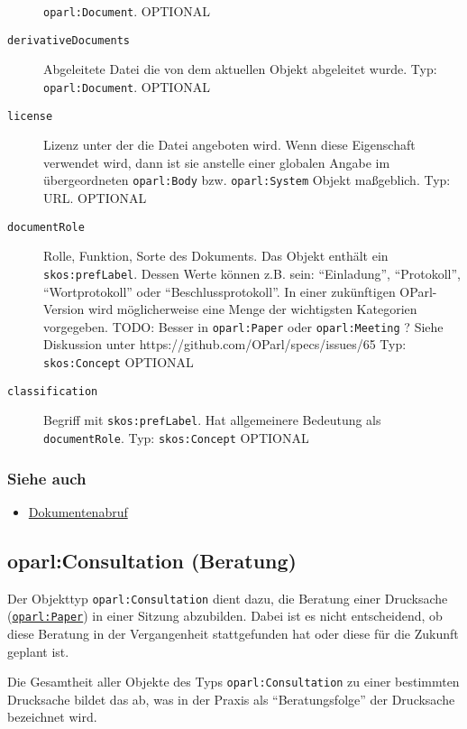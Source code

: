 \documentclass[,a4paper]{article}
\begin{document}
\begin{description}
\texttt{oparl:Document}. OPTIONAL
\item[\texttt{derivativeDocuments}]
Abgeleitete Datei die von dem aktuellen Objekt abgeleitet wurde. Typ:
\texttt{oparl:Document}. OPTIONAL
\item[\texttt{license}]
Lizenz unter der die Datei angeboten wird. Wenn diese Eigenschaft
verwendet wird, dann ist sie anstelle einer globalen Angabe im
übergeordneten \texttt{oparl:Body} bzw. \texttt{oparl:System} Objekt
maßgeblich. Typ: URL. OPTIONAL
\item[\texttt{documentRole}]
Rolle, Funktion, Sorte des Dokuments. Das Objekt enthält ein
\texttt{skos:prefLabel}. Dessen Werte können z.B. sein: ``Einladung'',
``Protokoll'', ``Wortprotokoll'' oder ``Beschlussprotokoll''. In einer
zukünftigen OParl-Version wird möglicherweise eine Menge der wichtigsten
Kategorien vorgegeben. TODO: Besser in \texttt{oparl:Paper} oder
\texttt{oparl:Meeting} ? Siehe Diskussion unter
https://github.com/OParl/specs/issues/65 Typ: \texttt{skos:Concept}
OPTIONAL
\item[\texttt{classification}]
Begriff mit \texttt{skos:prefLabel}. Hat allgemeinere Bedeutung als
\texttt{documentRole}. Typ: \texttt{skos:Concept} OPTIONAL
\end{description}

\subsubsection{Siehe auch}\label{siehe-auch}

\begin{itemize}
\itemsep1pt\parskip0pt
\item
  \hyperref[dokumentenabruf]{Dokumentenabruf}
\end{itemize}

\subsection{oparl:Consultation (Beratung)}\label{oparlux5fconsultation}

Der Objekttyp \texttt{oparl:Consultation} dient dazu, die Beratung einer
Drucksache (\hyperref[oparlux5fpaper]{\texttt{oparl:Paper}}) in einer
Sitzung abzubilden. Dabei ist es nicht entscheidend, ob diese Beratung
in der Vergangenheit stattgefunden hat oder diese für die Zukunft
geplant ist.

Die Gesamtheit aller Objekte des Typs \texttt{oparl:Consultation} zu
einer bestimmten Drucksache bildet das ab, was in der Praxis als
``Beratungsfolge'' der Drucksache bezeichnet wird.
\end{document}
